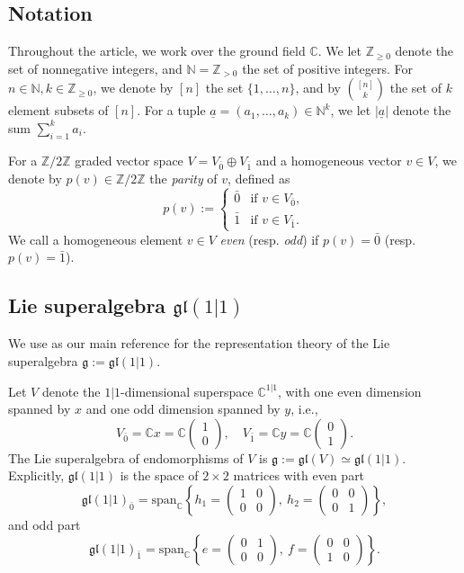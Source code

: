 \documentclass[11pt,a4paper,reqno]{amsart}
\newcommand{\g}{\mathfrak{g}}
\newcommand{\gl}{\mathfrak{gl}}
\newcommand{\C}{\mathbb{C}}
\newcommand{\Z}{\mathbb{Z}}
\newcommand{\N}{\mathbb{N}}
\renewcommand{\a}{\alpha}
\numberwithin{equation}{section}
\renewcommand{\a}{\underline a}
\theoremstyle{definition}
\theoremstyle{remark}
\begin{document}
\subsection{Notation}

Throughout the article, we work over the ground field $\C$. We let $\Z_{\ge0}$ denote the set of nonnegative integers, and $\N = \Z_{>0}$ the set of positive integers. For $n\in \N, k\in \Z_{\ge0}$, we denote by $[n]$ the set $\{1,\dots, n\}$, and by $\binom{[n]}{k}$ the set of $k$ element subsets of $[n]$. For a tuple $\a = (a_1,\dots,a_k)\in \N^k$, we let $|\a|$ denote the sum $\sum_{i=1}^k a_i$.

For a $\Z/2\Z$ graded vector space $V = V_{\bar0}\oplus V_{\bar 1}$ and a homogeneous vector $v\in V$, we denote by $p(v)\in\Z/2\Z$ the \emph{parity} of $v$, defined as
\[p(v):=\begin{cases} 
\bar0 &\text{if }v\in V_{\bar0},\\
\bar1 &\text{if }v\in V_{\bar1}.
\end{cases}\]
We call a homogeneous element $v\in V$ \emph{even} (resp. \emph{odd}) if $p(v)=\bar0$ (resp. $p(v)=\bar1$).

\subsection{Lie superalgebra \texorpdfstring{$\gl(1|1)$}{gl(1|1)}} 

We use \cite{cheng-wang} as our main reference for the representation theory of the Lie superalgebra $\g :=\gl(1|1)$. 

Let $V$ denote the $1|1$-dimensional superspace $\C^{1|1}$, with one even dimension spanned by $x$ and one odd dimension spanned by $y$, i.e.,
\[V_{\bar0} = \C x = \C\begin{pmatrix}
1\\ 0\end{pmatrix},\quad V_{\bar1} = \C y=\C\begin{pmatrix}
0\\ 1\end{pmatrix}.\]
The Lie superalgebra of endomorphisms of $V$ is $\g:=\gl(V)\simeq \gl(1|1)$. Explicitly, $\gl(1|1)$ is the space of $2\times 2$ matrices with even part
\[\gl(1|1)_{\bar0} = \mathrm{span}_\C\left\{
h_1 =\left(
\begin{array}{c|c}
    1 &0  \\
    \hline
    0 & 0
\end{array}
\right),\ 
h_2 =\left(
\begin{array}{c|c}
    0 & 0  \\
    \hline
    0 & 1
\end{array}
\right)
\right\},\]
and odd part
\[\gl(1|1)_{\bar1} = \mathrm{span}_\C\left\{
e =\left(
\begin{array}{c|c}
    0 & 1  \\
    \hline
    0 & 0
\end{array}
\right),\ 
f =\left(
\begin{array}{c|c}
    0 & 0  \\
    \hline
    1 & 0
\end{array}
\right)
\right\}.\]
\end{document}
